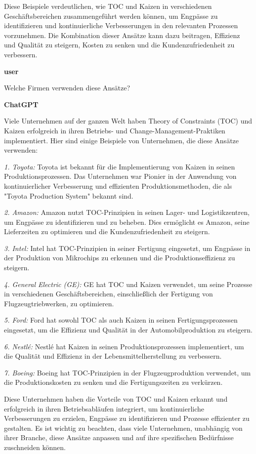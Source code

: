 Diese Beispiele verdeutlichen, wie TOC und Kaizen in verschiedenen Geschäftsbereichen zusammengeführt werden können, um Engpässe zu identifizieren und kontinuierliche Verbesserungen in den relevanten Prozessen vorzunehmen. Die Kombination dieser Ansätze kann dazu beitragen, Effizienz und Qualität zu steigern, Kosten zu senken und die Kundenzufriedenheit zu verbessern.

\textbf{user}

Welche Firmen verwenden diese Ansätze? 
 
\textbf{ChatGPT}

Viele Unternehmen auf der ganzen Welt haben Theory of Constraints (TOC) und Kaizen erfolgreich in ihren Betriebs- und Change-Management-Praktiken implementiert. Hier sind einige Beispiele von Unternehmen, die diese Ansätze verwenden:

\textit{1. Toyota:} Toyota ist bekannt für die Implementierung von Kaizen in seinen Produktionsprozessen. Das Unternehmen war Pionier in der Anwendung von kontinuierlicher Verbesserung und effizienten Produktionsmethoden, die als "Toyota Production System" bekannt sind.

\textit{2. Amazon:} Amazon nutzt TOC-Prinzipien in seinen Lager- und Logistikzentren, um Engpässe zu identifizieren und zu beheben. Dies ermöglicht es Amazon, seine Lieferzeiten zu optimieren und die Kundenzufriedenheit zu steigern.

\textit{3. Intel:} Intel hat TOC-Prinzipien in seiner Fertigung eingesetzt, um Engpässe in der Produktion von Mikrochips zu erkennen und die Produktionseffizienz zu steigern.

\textit{4. General Electric (GE):} GE hat TOC und Kaizen verwendet, um seine Prozesse in verschiedenen Geschäftsbereichen, einschließlich der Fertigung von Flugzeugtriebwerken, zu optimieren.

\textit{5. Ford:} Ford hat sowohl TOC als auch Kaizen in seinen Fertigungsprozessen eingesetzt, um die Effizienz und Qualität in der Automobilproduktion zu steigern.

\textit{6. Nestlé:} Nestlé hat Kaizen in seinen Produktionsprozessen implementiert, um die Qualität und Effizienz in der Lebensmittelherstellung zu verbessern.

\textit{7. Boeing:} Boeing hat TOC-Prinzipien in der Flugzeugproduktion verwendet, um die Produktionskosten zu senken und die Fertigungszeiten zu verkürzen.

Diese Unternehmen haben die Vorteile von TOC und Kaizen erkannt und erfolgreich in ihren Betriebsabläufen integriert, um kontinuierliche Verbesserungen zu erzielen, Engpässe zu identifizieren und Prozesse effizienter zu gestalten. Es ist wichtig zu beachten, dass viele Unternehmen, unabhängig von ihrer Branche, diese Ansätze anpassen und auf ihre spezifischen Bedürfnisse zuschneiden können.


